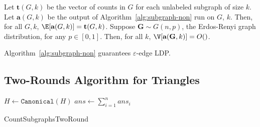 \begin{theorem}\label{thm:rr-algo}
  Let $\textbf{t}(G, k)$ be the vector of counts in $G$ for each unlabeled subgraph of
  size $k$. Let $\textbf{a}(G,k)$ be the output of Algorithm~\ref{alg:subgraph-non} 
  run on $G$, $k$. 
  Then, for all $G,k$, $\E[\textbf{a}(G,k)] = \textbf{t}(G,k)$.
  Suppose $\textbf{G} \sim G(n,p)$, the Erdos-Renyi graph distribution, for any
  $p \in [0,1]$. Then, for all $k$, $\V[\textbf{a}(\textbf{G}, k)] = O()$.
\end{theorem}

\begin{theorem}
  Algorithm~\ref{alg:subgraph-non} guarantees $\varepsilon$-edge LDP.
\end{theorem}
\subsection{Two-Rounds Algorithm for Triangles}
\label{sub:two_rounds}
\begin{algorithm}
  \SetAlgoLined
  $H \leftarrow \texttt{Canonical}(H)$\;
  $ans \leftarrow \sum_{i=1}^n ans_i$\;
  \caption{CountSubgraphsTwoRound}
\end{algorithm}
